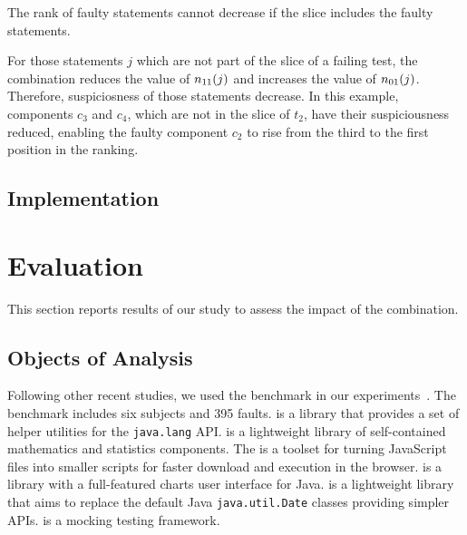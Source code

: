 \documentclass[sigplan,10pt,review,anonymous]{acmart}\settopmatter{printfolios=true,printccs=false,printacmref=false}
\begin{document}

\begin{theorem}
  The rank of faulty statements cannot decrease if the slice includes
  the faulty statements.
\end{theorem}  

For those statements $j$ which are not part of the slice of a failing
test, the combination reduces the value of $n_{11}(j)$ and increases the
value of $n_{01}(j)$. Therefore, suspiciosness of those statements
decrease. In this example, components $c_3$ and $c_4$, which are not
in the slice of $t_2$, have their suspiciousness reduced, enabling the
faulty component $c_2$ to rise from the third to the first position in
the ranking. 


\subsection{Implementation}


\section{Evaluation}
\label{sec:eval}


This section reports results of our study to assess the impact of the
\comb{} combination.

\subsection{Objects of Analysis}

Following other recent studies, we used the \dfj{} benchmark in our
experiments~\cite{just-defects4j-issta2014}. The \dfj{} benchmark
includes six subjects and 395 faults.
\lang{} is a library
that provides a set of helper utilities for the {\small\texttt{java.lang}}
API. \cmath{} is a lightweight library of self-contained
mathematics and statistics components. The \closure{} is a toolset for
turning JavaScript files into smaller scripts for faster
download and execution in the browser. \chart{} is a library with a
full-featured charts user interface for Java. \jtime{} is a
lightweight library that aims to replace the default Java
{\small\texttt{java.util.Date}} classes providing simpler APIs. \mockito{} is
a mocking testing framework.
\end{document}
